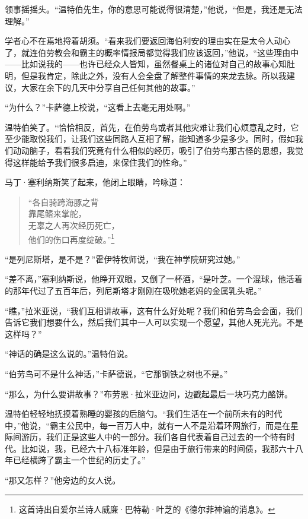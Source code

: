 \documentclass[AutoFakeBold=true]{book}
\begin{document}
领事摇摇头。``温特伯先生，你的意思可能说得很清楚，''他说，``但是，我还是无法理解。''

学者心不在焉地捋着胡须。``看来我们要返回海伯利安的理由实在是太令人动心了，就连伯劳教会和霸主的概率情报局都觉得我们应该返回，''他说，``这些理由中——比如说我的——也许已经众人皆知，虽然餐桌上的诸位对自己的故事心知肚明，但是我肯定，除此之外，没有人会全盘了解整件事情的来龙去脉。所以我建议，大家在余下的几天中分享自己任何其他的故事。''

``为什么？''卡萨德上校说，``这看上去毫无用处啊。''

温特伯笑了。``恰恰相反，首先，在伯劳鸟或者其他灾难让我们心烦意乱之时，它至少能取悦我们，让我们这些同路人互相了解，能知道多少是多少。同时，假如我们动动脑子，看看我们究竟有什么相似的经历，吸引了伯劳鸟那古怪的思想，我觉得这样能给予我们很多启迪，来保住我们的性命。''

马丁·塞利纳斯笑了起来，他闭上眼睛，吟咏道：

\begin{quote}
	{\kaishu ``各自骑跨海豚之背\\
	靠尾鳍来掌舵，\\
	无辜之人再次经历死亡，\\
	他们的伤口再度绽破。''}\footnote{这首诗出自爱尔兰诗人威廉·巴特勒·叶芝的《德尔菲神谕的消息》。}
\end{quote}

``是列尼斯塔，是不是？''霍伊特牧师说，``我在神学院研究过她。''

``差不离，''塞利纳斯说，他睁开双眼，又倒了一杯酒，``是叶芝。一个混球，他活着的那年代过了五百年后，列尼斯塔才刚刚在吸吮她老妈的金属乳头呢。''

``瞧，''拉米亚说，``我们互相讲故事，这有什么好处呢？我们和伯劳鸟会会面，我们告诉它我们想要什么，然后我们其中一人可以实现一个愿望，其他人死光光。不是这样吗？''

``神话的确是这么说的。''温特伯说。

``伯劳鸟可不是什么神话，''卡萨德说，``它那钢铁之树也不是。''

``那么，为什么要讲故事？''布劳恩·拉米亚边问，边戳起最后一块巧克力酪饼。

温特伯轻轻地抚摸着熟睡的婴孩的后脑勺。``我们生活在一个前所未有的时代中，''他说，``霸主公民中，每一百万人中，就有一人不是沿着环网旅行，而是在星际间游历，我们正是这些人中的一部分。我们各自代表着自己过去的一个特有时代。比如说，我，已经六十八标准年龄，但是由于旅行带来的时间债，我那六十八年已经横跨了霸主一个世纪的历史了。''

``那又怎样？''他旁边的女人说。
\end{document}
